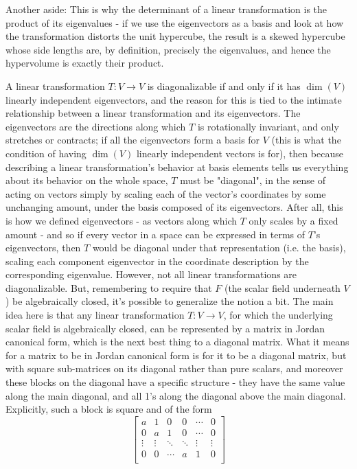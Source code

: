 \documentclass{article}
\newcommand{\n}{\leavevmode \newline}
\newcommand{\nn}{\leavevmode \newline \newline}
\begin{document}
\n
\begin{adjustwidth}{1cm}{1cm}
	Another aside: This is why the determinant of a linear transformation is the product of its eigenvalues - if we use the eigenvectors as a basis and look at how the transformation distorts the unit hypercube, the result is a skewed hypercube whose side lengths are, by definition, precisely the eigenvalues, and hence the hypervolume is exactly their product.
\end{adjustwidth}
\n
A linear transformation $ T: V \rightarrow V $ is diagonalizable if and only if it has $ \dim(V) $ linearly independent eigenvectors, and the reason for this is tied to the intimate relationship between a linear transformation and its eigenvectors. The eigenvectors are the directions along which $ T $ is rotationally invariant, and only stretches or contracts; if all the eigenvectors form a basis for $ V $ (this is what the condition of having $ \dim(V) $ linearly independent vectors is for), then because describing a linear transformation's behavior at basis elements tells us everything about its behavior on the whole space, $ T $ must be "diagonal", in the sense of acting on vectors simply by scaling each of the vector's coordinates by some unchanging amount, under the basis composed of its eigenvectors. After all, this is how we defined eigenvectors - as vectors along which $ T $ only scales by a fixed amount - and so if every vector in a space can be expressed in terms of $ T $'s eigenvectors, then $ T $ would be diagonal under that representation (i.e. the basis), scaling each component eigenvector in the coordinate description by the corresponding eigenvalue.
\nn
However, not all linear transformations are diagonalizable. But, remembering to require that $ F $ (the scalar field underneath $ V $) be algebraically closed, it's possible to generalize the notion a bit. The main idea here is that any linear transformation $ T: V \rightarrow V $, for which the underlying scalar field is algebraically closed, can be represented by a matrix in Jordan canonical form, which is the next best thing to a diagonal matrix. What it means for a matrix to be in Jordan canonical form is for it to be a diagonal matrix, but with square sub-matrices on its diagonal rather than pure scalars, and moreover these blocks on the diagonal have a specific structure - they have the same value along the main diagonal, and all 1's along the diagonal above the main diagonal. Explicitly, such a block is square and of the form
	$$ \begin{bmatrix}
		a & 1 & 0 & 0 &\cdots &0 \\
		0 & a & 1 & 0 & \cdots & 0 \\
		\vdots & \vdots & \ddots & \ddots & \vdots & \vdots \\
		0 & 0 & \cdots & a & 1 & 0 \\
	\end{bmatrix} $$
\end{document}
